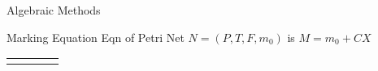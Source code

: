 \documentclass{beamer}
\begin{document}
\begin{frame}{Algebraic Methods}
  \begin{block}{Marking Equation}
Eqn of Petri Net $N= (P,T,F,m_0)$  is  $M = m_0+CX$
\end{block}
\begin{tabular}{c c c c}
{ \raisebox{2cm}{$C = 
\begin{bmatrix}
  {} & t1 & t2 \\
  p1 & 0 & 0 \\
  p2 & -1 & 1  \\
  p3 & 1  & -1 
\end{bmatrix}
$}} &\raisebox{2cm}{{ $X = 
\begin{bmatrix}
   2 & t1\\
  1 & t2
\end{bmatrix}$}} & \raisebox{2cm}{$m_0 = \begin{bmatrix}
  1 \\
  1 \\
  0
\end{bmatrix}$} &{

\tikzset{every picture/.style={line width=0.4pt}} %

\begin{tikzpicture}[x=0.35pt,y=0.35pt,yscale=-1,xscale=1]


\end{tikzpicture}}
\end{tabular}
\end{frame}
\end{document}
